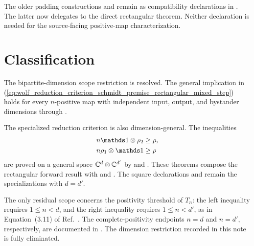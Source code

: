 \documentclass{article}
\begin{document}
The older padding constructions
 and
 remain as
compatibility declarations in
. The latter now delegates to the
direct rectangular theorem. Neither declaration is needed for the
source-facing positive-map characterization.

\section{Classification}

The bipartite-dimension scope restriction is resolved. The general implication
in
(\ref{eq:wolf_reduction_criterion_schmidt_premise_rectangular_mixed_step})
holds for every $n$-positive map with independent input, output, and bystander
dimensions through
.

The specialized reduction criterion is also dimension-general. The inequalities
\begin{align}
    n\Id\otimes\rho_2&\geq\rho,
    \label{eq:wolf_reduction_criterion_schmidt_premise_general_left_result}\\
    n\rho_1\otimes\Id&\geq\rho
    \label{eq:wolf_reduction_criterion_schmidt_premise_general_right_result}
\end{align}
are proved on a general space $\mathbb{C}^d\otimes\mathbb{C}^{d'}$ by
 and
. These
theorems compose the rectangular forward result with
 and
. The square declarations
 and
 remain the
specializations with $d=d'$.

The only residual scope concerns the positivity threshold of $T_n$: the left
inequality requires $1\leq n<d$, and the right inequality requires
$1\leq n<d'$, as in Equation~(3.11) of
Ref.~\cite{Wolf2012Quantum}. The complete-positivity endpoints $n=d$ and
$n=d'$, respectively, are documented in
. The dimension
restriction recorded in this note is fully eliminated.



\end{document}
